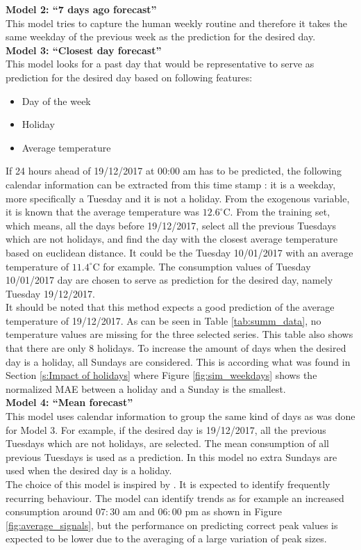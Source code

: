 \textbf{Model 2: ``7 days ago forecast''}\\
This model tries to capture the human weekly routine and therefore it takes the same weekday of the previous week as the prediction for the desired day.\\

\textbf{Model 3: ``Closest day forecast''}\\
This model looks for a past day that would be representative to serve as prediction for the desired day based on following features:

\begin{itemize}
	\item Day of the week
	\item Holiday
	\item Average temperature
\end{itemize}

If 24 hours ahead of 19/12/2017 at 00:00 am has to be predicted, the following calendar information can be extracted from this time stamp : it is a weekday, more specifically a Tuesday and it is not a holiday. From the exogenous variable, it is known that the average temperature was $12.6^\circ$C. From the training set, which means, all the days before 19/12/2017, select all the previous Tuesdays which are not holidays, and find the day with the closest average temperature based on euclidean distance. It could be the Tuesday 10/01/2017 with an average temperature of $11.4^\circ$C for example. The consumption values of Tuesday 10/01/2017 day are chosen to serve as prediction for the desired day, namely Tuesday 19/12/2017.\\ 
It should be noted that this method expects a good prediction of the average temperature of 19/12/2017. As can be seen in Table \ref{tab:summ_data}, no temperature values are missing for the three selected series. This table also shows that there are only  $ 8 $ holidays. To increase the amount of days when the desired day is a holiday, all Sundays are considered. This is according what was found in Section \ref{s:Impact of holidays} where Figure \ref{fig:sim_weekdays} shows the normalized MAE between a holiday and a Sunday is the smallest. \\

  
 \textbf{Model 4: ``Mean forecast''}\\
 This model uses calendar information to group the same kind of days as was done for Model 3. For example, if the desired day is 19/12/2017, all the previous Tuesdays which are not holidays, are selected. The mean consumption of all previous Tuesdays is used as a prediction.  In this model no extra Sundays are used when the desired day is a holiday.\\
The choice of this model is inspired by \cite{Kong2019}. It is expected to identify frequently recurring behaviour. The model can identify trends as for example an increased consumption around $ 07:30 $ am and $ 06:00 $ pm as shown in Figure \ref{fig:average_signals}, but the performance on predicting correct peak values is expected to be lower due to the averaging of a large variation of peak sizes.\\
 
